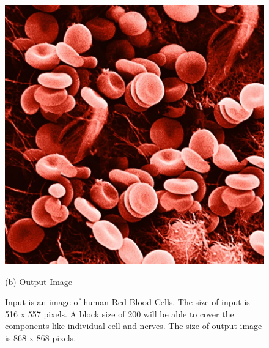 \documentclass[12pt,a4paper]{report}
\begin{document}
\begin{figure}[H]
  \includegraphics[scale=0.25]{pics/rbc_cut.png}
    \caption*{(b) Output Image}
  \endminipage
  \caption{Input is an image of human Red Blood Cells. The size of input is 516 x 557 pixels. A block size of 200 will be able to cover the components like individual cell and nerves. The size of output image is 868 x 868 pixels.}
  
\end{figure}
\end{document}
